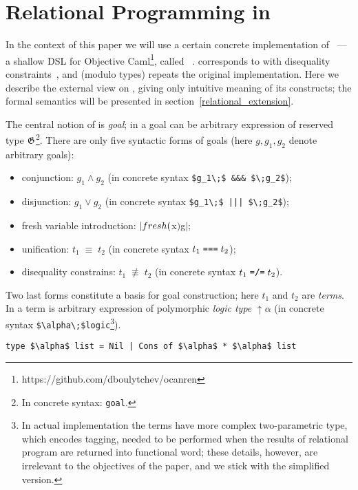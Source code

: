 \section{Relational Programming in \miniKanren}
\label{ocanren}

In the context of this paper we will use a certain concrete implementation of ~--- a shallow DSL for Objective 
Caml\footnote{https://github.com/dboulytchev/ocanren}, called \ocanren~\cite{ocanren}. \ocanren corresponds to \miniKanren with
disequality constraints~\cite{CKanren}, and (modulo types) repeats the original implementation. Here we describe the external view 
on \ocanren, giving only intuitive meaning of its constructs; the formal semantics will be presented in section~\ref{relational_extension}.

The central notion of \miniKanren is \emph{goal}; in \ocanren a goal can be arbitrary expression of reserved type $\mathfrak G$\footnote{In concrete syntax: \lstinline|goal|.}.
There are only five syntactic forms of goals (here $g, g_1, g_2$ denote arbitrary goals):

\begin{itemize}
  \item conjunction: $g_1\wedge g_2$ (in concrete syntax \lstinline|$g_1\;$ &&& $\;g_2$|);
  \item disjunction: $g_1\vee g_2$ (in concrete syntax \lstinline!$g_1\;$ ||| $\;g_2$!);
  \item fresh variable introduction: $\lstinline|fresh ($x$) $\;g$|$;
  \item unification: $t_1\;\equiv\;t_2$ (in concrete syntax $t_1\; \mbox{\texttt{===}} \;t_2$);
  \item disequality constrains: $t_1\;\not\equiv\;t_2$ (in concrete syntax $t_1\; \mbox{\texttt{=/=}} \;t_2$).
\end{itemize}

Two last forms constitute a basis for goal construction; here $t_1$ and $t_2$ are \emph{terms}. In \ocanren a term is
arbitrary expression of polymorphic \emph{logic type} $\uparrow\!\alpha$ (in concrete syntax \lstinline|$\alpha\;$logic|\footnote{In actual 
implementation the terms have more complex two-parametric type, which encodes tagging, needed to be performed when the results of
relational program are returned into functional word; these details, however, are irrelevant to the objectives of the paper, and we stick with the 
simplified version.}).

\begin{lstlisting}
type $\alpha$ list = Nil | Cons of $\alpha$ * $\alpha$ list
\end{lstlisting}
